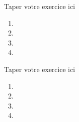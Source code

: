 \documentclass[a4paper, 12pt]{report}
\begin{document}
\begin{myexo}
	Taper votre exercice ici
	\begin{enumerate}
		\item 
		
		\item 
		\item 
		\item
		
	\end{enumerate}
	
\end{myexo}
\begin{myexo}
	Taper votre exercice ici
	\begin{enumerate}
		\item 
		
		\item 
		\item 
		\item
		
	\end{enumerate}
	
\end{myexo}
\end{document}
